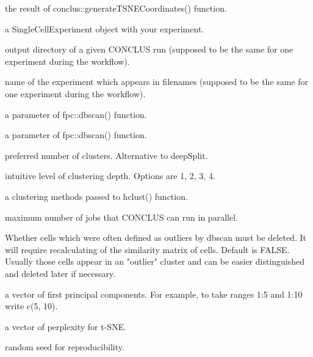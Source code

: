 \documentclass[a4paper]{book}
\begin{document}
%
\begin{Arguments}
\begin{ldescription}
\item[\code{tSNEResults}] the result of conclus::generateTSNECoordinates() function.

\item[\code{sceObject}] a SingleCellExperiment object with your experiment.

\item[\code{dataDirectory}] output directory of a given CONCLUS run (supposed to be the same for one experiment during the workflow).

\item[\code{experimentName}] name of the experiment which appears in filenames (supposed to be the same for one experiment during the workflow).

\item[\code{epsilon}] a parameter of fpc::dbscan() function.

\item[\code{minPoints}] a parameter of fpc::dbscan() function.

\item[\code{k}] preferred number of clusters. Alternative to deepSplit.

\item[\code{deepSplit}] intuitive level of clustering depth. Options are 1, 2, 3, 4.

\item[\code{clusteringMethod}] a clustering methods passed to hclust() function.

\item[\code{cores}] maximum number of jobs that CONCLUS can run in parallel.

\item[\code{deleteOutliers}] Whether cells which were often defined as outliers by dbscan must be deleted.
It will require recalculating of the similarity matrix of cells. Default is FALSE.
Usually those cells appear in an "outlier" cluster and can be easier distinguished and deleted later
if necessary.

\item[\code{PCs}] a vector of first principal components.
For example, to take ranges 1:5 and 1:10 write c(5, 10).

\item[\code{perplexities}] a vector of perplexity for t-SNE.

\item[\code{randomSeed}] random seed for reproducibility.
\end{ldescription}
\end{Arguments}
\end{document}
